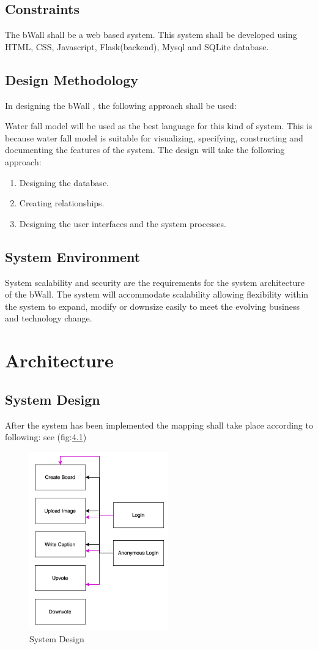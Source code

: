 \documentclass[12pt]{report}
\begin{document}
\section{Constraints}
The bWall shall be a web based system. This system shall be developed using HTML, CSS, Javascript, Flask(backend), Mysql and SQLite database.

\section{Design Methodology}
In designing the bWall , the following approach shall be
used:

Water fall model will be used as the best language for this
kind of system. This is because water fall model is suitable for
visualizing, specifying, constructing and documenting the features
of the system.
The design will take the following approach:
\begin{enumerate}
    \item Designing the database.
    \item Creating relationships.
    \item Designing the user interfaces and the system processes.
\end{enumerate}

\section{System Environment}
System scalability and security are the requirements for the system architecture of the bWall. The system will accommodate scalability allowing flexibility within the system to expand, modify or downsize easily to meet the evolving business and technology change.

\chapter{Architecture}

\section{System Design}
After the system has been implemented the mapping shall take place according to following: see (fig:\ref{fig:sysdesign})
\begin{figure}[H]
\centering
\includegraphics[width=6cm]{system design.png}
\caption{System Design}
\label{fig:sysdesign}
\end{figure}
\end{document}
